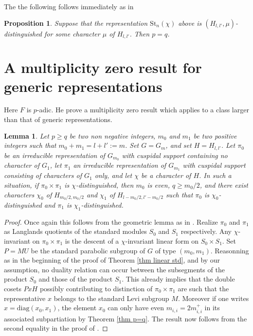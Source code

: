 \documentclass[11pt,letterpaper]{amsart}
\def\St{\mathrm{St}}
\def\diag{\mathrm{diag}}
\theoremstyle{plain}
\newtheorem{lem}[thm]{Lemma}  \newtheorem{prop}[thm]{Proposition}
\numberwithin{equation}{section}
\begin{document}
The the following follows immediately as in \cite[Theorem 3.1]{MatJNT}

\begin{prop}\label{prop st p=q}
Suppose that the representation $\St_n(\chi)$ above is $(H_{l,l'},\mu)$-distinguished for some character $\mu$ of $H_{l,l'}$. 
Then $p=q$.
\end{prop}

\section{A multiplicity zero result for generic representations}\label{app mult zero}

Here $F$ is $p$-adic. He prove a multiplicity zero result which applies to a class larger than that of generic representations. 

\begin{lem}\label{lm prod}
Let $p\geq q$ be two non negative integers, $m_0$ and $m_1$ be two positive integers such that $m_0+m_1=l+l':=m$. Set $G=G_m$, and set $H=H_{l,l'}$. Let $\pi_0$ be an irreducible representation of $G_{m_0}$ with cuspidal support containing no character of $G_1$, let $\pi_1$ an irreducible representation of $G_{m_1}$ with cuspidal support consisting of characters of $G_1$ only, and let $\chi$ be a character of $H$. In such a situation, if 
$\pi_0\times \pi_1$ is $\chi$-distinguished, then $m_0$ is even, $q\geq m_0/2$, and there exist characters $\chi_0$ of $H_{m_0/2 ,m_0/2 }$ and $\chi_1$ of $H_{l-m_0/2 ,l'-m_0/2}$ such that $\pi_0$ is $\chi_0$-distinguished and $\pi_1$ is $\chi_1$-distinguished.
\end{lem}
\begin{proof}
Once again this follows from the geometric lemma as in \cite{OJNT}. Realize $\pi_0$ and $\pi_1$ as Langlands quotients of the standard modules $S_0$ and $S_1$ respectively. Any $\chi$-invariant on $\pi_0\times \pi_1$ is the descent of a $\chi$-invariant linear form on $S_0\times S_1$. Set $P=MU$ be the standard parabolic subgroup of $G$ of type $(m_0,m_1)$. Reasonning as in the beginning of the proof of Theorem \ref{thm linear std}, and by our assumption, no duality relation can occur between the subsegments of the product $S_0$ and those of the product $S_1$. This already implies that the double cosets $PxH$ possibly contributing to distinction of $\pi_0\times \pi_1$ are such that the representative $x$ belongs to the standard Levi subgroup $M$. Moreover if one writes 
$x=\diag(x_0,x_1)$, the element $x_0$ can only have even $m_{i,i}=2m_{i,i}^+$ in its associated subpartiation by Theorem \ref{thm p=q}. The result now follows from the second equality in the proof of \cite[Proposition 3.1]{OJNT}.
\end{proof}
\end{document}
